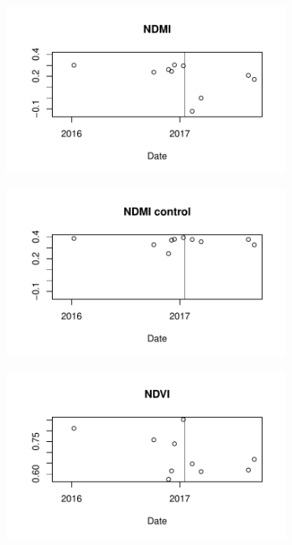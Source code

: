 \documentclass[a4paper,12pt]{scrbook}
\begin{document}
\begin{figure}
  \centering
  \begin{subfigure}[b]{0.45\textwidth}
    \includegraphics[width=\textwidth]{thesis-figures/08-guyana-ts-ndmi}
  \end{subfigure}
  \begin{subfigure}[b]{0.45\textwidth}
    \includegraphics[width=\textwidth]{thesis-figures/21-guyana-ts-control}
  \end{subfigure}
  \begin{subfigure}[b]{0.45\textwidth}
    \includegraphics[width=\textwidth]{thesis-figures/20-guyana-ts-ndvi}

\end{subfigure}
\end{figure}
\end{document}
